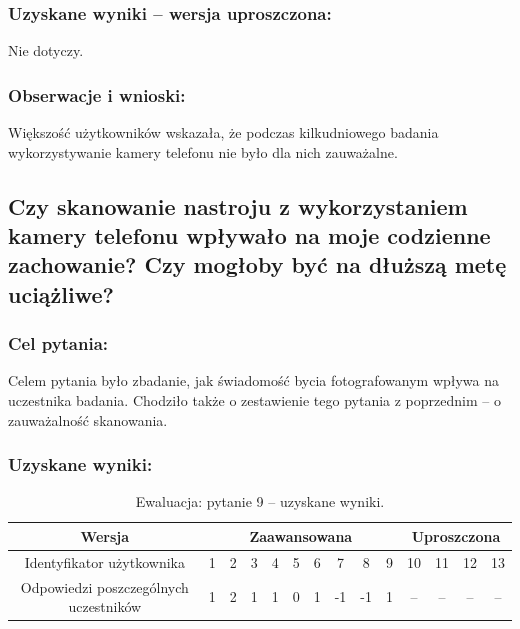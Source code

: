 	\subsubsection{Uzyskane wyniki -- wersja uproszczona:}
	
	Nie dotyczy.
	
	\subsubsection{Obserwacje i wnioski:}
	
	Większość użytkowników wskazała, że podczas kilkudniowego badania wykorzystywanie kamery telefonu nie było dla nich zauważalne. 
	
	
	
\subsection{Czy skanowanie nastroju z wykorzystaniem kamery telefonu wpływało na moje codzienne zachowanie? Czy mogłoby być na dłuższą metę uciążliwe?}
	
	\subsubsection{Cel pytania:}
	
	Celem pytania było zbadanie, jak świadomość bycia fotografowanym wpływa na uczestnika badania. Chodziło także o zestawienie tego pytania z poprzednim -- o zauważalność skanowania.
	
	\subsubsection{Uzyskane wyniki:}
	
	\begin{table}[!h]
		\caption{Ewaluacja: pytanie 9 -- uzyskane wyniki.}
		\centering
		\begin{tabular}{|c|c|c|c|c|c|c|c|c|c|c|c|c|c|}
			\hline
			Wersja &  \multicolumn{9}{c|}{Zaawansowana} & \multicolumn{4}{c|}{Uproszczona}\\ \hline
			Identyfikator użytkownika             & 1 & 2 & 3 & 4 & 5 & 6 & 7 & 8 & 9 
			& 10 & 11 & 12 & 13 \\ \hline
			Odpowiedzi poszczególnych uczestników & 1 & 2 & 1 & 1 & 0 & 1 & -1 & -1 & 1
			& -- & -- & -- & --     \\ \hline
		\end{tabular}
	\end{table}
	
